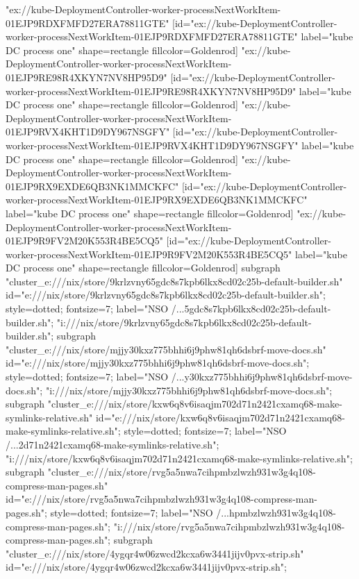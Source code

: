 {"ex://kube-DeploymentController-worker-processNextWorkItem-01EJP9RDXFMFD27ERA78811GTE" [id="ex://kube-DeploymentController-worker-processNextWorkItem-01EJP9RDXFMFD27ERA78811GTE" label="kube DC process one" shape=rectangle fillcolor=Goldenrod]
"ex://kube-DeploymentController-worker-processNextWorkItem-01EJP9RE98R4XKYN7NV8HP95D9" [id="ex://kube-DeploymentController-worker-processNextWorkItem-01EJP9RE98R4XKYN7NV8HP95D9" label="kube DC process one" shape=rectangle fillcolor=Goldenrod]
"ex://kube-DeploymentController-worker-processNextWorkItem-01EJP9RVX4KHT1D9DY967NSGFY" [id="ex://kube-DeploymentController-worker-processNextWorkItem-01EJP9RVX4KHT1D9DY967NSGFY" label="kube DC process one" shape=rectangle fillcolor=Goldenrod]
"ex://kube-DeploymentController-worker-processNextWorkItem-01EJP9RX9EXDE6QB3NK1MMCKFC" [id="ex://kube-DeploymentController-worker-processNextWorkItem-01EJP9RX9EXDE6QB3NK1MMCKFC" label="kube DC process one" shape=rectangle fillcolor=Goldenrod]
"ex://kube-DeploymentController-worker-processNextWorkItem-01EJP9R9FV2M20K553R4BE5CQ5" [id="ex://kube-DeploymentController-worker-processNextWorkItem-01EJP9R9FV2M20K553R4BE5CQ5" label="kube DC process one" shape=rectangle fillcolor=Goldenrod]
subgraph "cluster_e:///nix/store/9krlzvny65gdc8s7kpb6lkx8cd02c25b-default-builder.sh" {
id="e:///nix/store/9krlzvny65gdc8s7kpb6lkx8cd02c25b-default-builder.sh";
style=dotted;
fontsize=7;
label="NSO /...5gdc8s7kpb6lkx8cd02c25b-default-builder.sh";
"i:///nix/store/9krlzvny65gdc8s7kpb6lkx8cd02c25b-default-builder.sh";
}
subgraph "cluster_e:///nix/store/mjjy30kxz775bhhi6j9phw81qh6dsbrf-move-docs.sh" {
id="e:///nix/store/mjjy30kxz775bhhi6j9phw81qh6dsbrf-move-docs.sh";
style=dotted;
fontsize=7;
label="NSO /...y30kxz775bhhi6j9phw81qh6dsbrf-move-docs.sh";
"i:///nix/store/mjjy30kxz775bhhi6j9phw81qh6dsbrf-move-docs.sh";
}
subgraph "cluster_e:///nix/store/kxw6q8v6isaqjm702d71n2421cxamq68-make-symlinks-relative.sh" {
id="e:///nix/store/kxw6q8v6isaqjm702d71n2421cxamq68-make-symlinks-relative.sh";
style=dotted;
fontsize=7;
label="NSO /...2d71n2421cxamq68-make-symlinks-relative.sh";
"i:///nix/store/kxw6q8v6isaqjm702d71n2421cxamq68-make-symlinks-relative.sh";
}
subgraph "cluster_e:///nix/store/rvg5a5nwa7cihpmbzlwzh931w3g4q108-compress-man-pages.sh" {
id="e:///nix/store/rvg5a5nwa7cihpmbzlwzh931w3g4q108-compress-man-pages.sh";
style=dotted;
fontsize=7;
label="NSO /...hpmbzlwzh931w3g4q108-compress-man-pages.sh";
"i:///nix/store/rvg5a5nwa7cihpmbzlwzh931w3g4q108-compress-man-pages.sh";
}
subgraph "cluster_e:///nix/store/4ygqr4w06zwcd2kcxa6w3441jijv0pvx-strip.sh" {
id="e:///nix/store/4ygqr4w06zwcd2kcxa6w3441jijv0pvx-strip.sh";
}}
